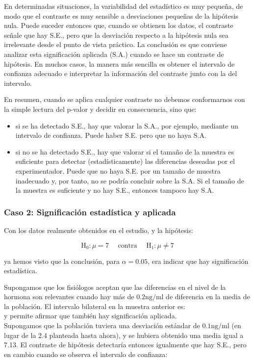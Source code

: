 \documentclass[
]{article}
\providecommand{\tightlist}{%
  \setlength{\itemsep}{0pt}\setlength{\parskip}{0pt}}
\begin{document}
En determinadas situaciones, la variabilidad del estadístico es muy pequeña, de modo que el contraste es muy sensible a desviaciones pequeñas de la hipótesis nula. Puede suceder entonces que, cuando se obtienen los datos, el contraste señale que hay S.E., pero que la desviación respecto a la hipótesis nula sea irrelevante desde el punto de vista práctico. La conclusión es que conviene analizar esta significación aplicada (S.A.) cuando se hace un contraste de hipótesis. En muchos casos, la manera más sencilla es obtener el intervalo de confianza adecuado e interpretar la información del contraste junto con la del intervalo.

En resumen, cuando se aplica cualquier contraste no debemos conformarnos con la simple lectura del p-valor y decidir en consecuencia, sino que:

\begin{itemize}
\tightlist
\item
  si se ha detectado S.E., hay que valorar la S.A., por ejemplo, mediante un intervalo de confianza. Puede haber S.E. pero que no haya S.A.\\
\item
  si no se ha detectado S.E., hay que valorar si el tamaño de la muestra es suficiente para detectar (estadísticamente) las diferencias deseadas por el experimentador. Puede que no haya S.E. por un tamaño de muestra inadecuado y, por tanto, no se podría concluir sobre la S.A. Si el tamaño de la muestra es suficiente y no hay S.E., entonces tampoco hay S.A.
\end{itemize}

\subsubsection{Caso 2: Significación estadística y aplicada}\label{caso-2-significaciuxf3n-estaduxedstica-y-aplicada}

Con los datos realmente obtenidos en el estudio, y la hipótesis:

\[
\mathrm{H}_{0}: \mu=7 \quad \text { contra } \quad \mathrm{H}_{1}: \mu \neq 7
\]

ya hemos visto que la conclusión, para \(\alpha=0.05\), era indicar que hay significación estadística.

Supongamos que los fisiólogos aceptan que las diferencias en el nivel de la hormona son relevantes cuando hay más de \(0.2 \mathrm{ng} / \mathrm{ml}\) de diferencia en la media de la población. El intervalo bilateral en la muestra anterior es:\\
y permite afirmar que también hay significación aplicada.\\
Supongamos que la población tuviera una desviación estándar de \(0.1 \mathrm{ng} / \mathrm{ml}\) (en lugar de la 2.4 planteada hasta ahora), y se hubiera obtenido una media igual a 7.13. El contraste de hipótesis detectaría entonces igualmente que hay S.E., pero en cambio cuando se observa el intervalo de confianza:
\end{document}
